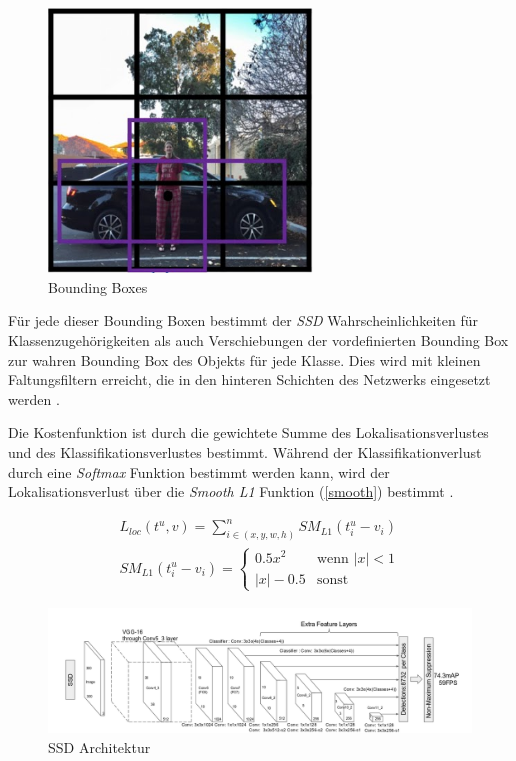 \begin{figure}[ht]
	\begin{center}
		\includegraphics[width=7cm]{Bilder/bounding_boxes.png} 
		\caption[Bounding Boxes]{Bounding Boxes \cite{AndrewNg.2019}}
		\label{boundingboxes}
	\end{center}
\end{figure}

Für jede dieser Bounding Boxen bestimmt der \textit{SSD} Wahrscheinlichkeiten für Klassenzugehörigkeiten als auch Verschiebungen der vordefinierten Bounding Box zur wahren Bounding Box des Objekts für jede Klasse. Dies wird mit kleinen Faltungsfiltern erreicht, die in den hinteren Schichten des Netzwerks eingesetzt werden \cite{ssd.20161229}.

Die Kostenfunktion ist durch die gewichtete Summe des Lokalisationsverlustes und des Klassifikationsverlustes bestimmt. Während der Klassifikationverlust durch eine \textit{Softmax} Funktion bestimmt werden kann, wird der Lokalisationsverlust über die \textit{Smooth L1} Funktion (\ref{smooth}) bestimmt \cite{ssd.20161229}.

\begin{equation}\label{smooth}
\begin{split}
L_{loc}(t^u,v) = \sum\limits_{i \in (x,y,w,h)}^{n} SM_{L1}(t^u_i - v_i) \\
SM_{L1}(t^u_i - v_i) = \begin{cases}
							0.5x^2      & \text{wenn } |x| < 1\\
							|x| - 0.5   & \text{sonst}
						   \end{cases}
\end{split}
\end{equation}

\begin{figure}[ht]
	\begin{center}
		\includegraphics[width=15cm]{Bilder/ssd_architecture.png} 
		\caption[SSD Architektur]{SSD Architektur \cite{ssd.20161229}}
		\label{architecture}
	\end{center}
\end{figure}

